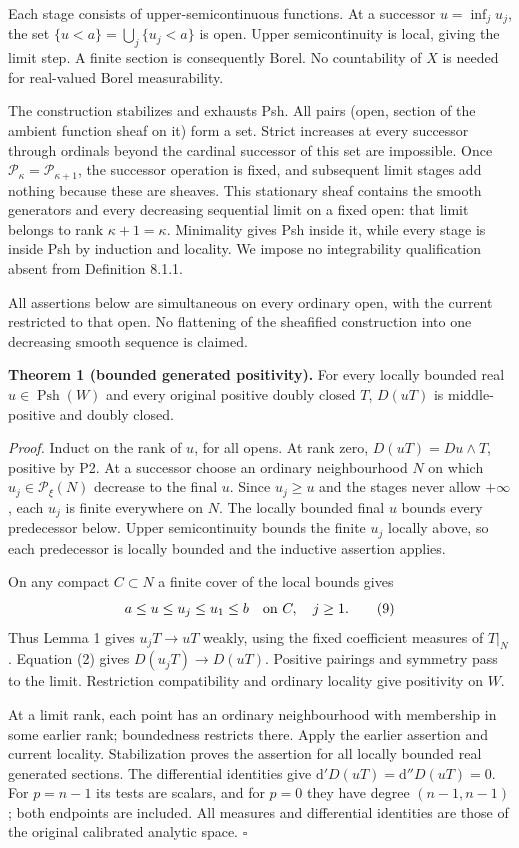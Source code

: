 \documentclass[
  11pt,
]{article}
\begin{document}
Each stage consists of upper-semicontinuous functions. At a successor
\(u=\inf_j u_j\), the set \(\{u<a\}=\bigcup_j\{u_j<a\}\) is open. Upper
semicontinuity is local, giving the limit step. A finite section is
consequently Borel. No countability of \(X\) is needed for real-valued
Borel measurability.

The construction stabilizes and exhausts Psh. All pairs (open, section
of the ambient function sheaf on it) form a set. Strict increases at
every successor through ordinals beyond the cardinal successor of this
set are impossible. Once \(\mathcal P_\kappa=\mathcal P_{\kappa+1}\),
the successor operation is fixed, and subsequent limit stages add
nothing because these are sheaves. This stationary sheaf contains the
smooth generators and every decreasing sequential limit on a fixed open:
that limit belongs to rank \(\kappa+1=\kappa\). Minimality gives Psh
inside it, while every stage is inside Psh by induction and locality. We
impose no integrability qualification absent from Definition 8.1.1.

All assertions below are simultaneous on every ordinary open, with the
current restricted to that open. No flattening of the sheafified
construction into one decreasing smooth sequence is claimed.

\textbf{Theorem 1 (bounded generated positivity).} For every locally
bounded real \(u\in\operatorname{Psh}(W)\) and every original positive
doubly closed \(T\), \(D(uT)\) is middle-positive and doubly closed.

\emph{Proof.} Induct on the rank of \(u\), for all opens. At rank zero,
\(D(uT)=Du\wedge T\), positive by P2. At a successor choose an ordinary
neighbourhood \(N\) on which \(u_j\in\mathcal P_\xi(N)\) decrease to the
final \(u\). Since \(u_j\geq u\) and the stages never allow \(+\infty\),
each \(u_j\) is finite everywhere on \(N\). The locally bounded final
\(u\) bounds every predecessor below. Upper semicontinuity bounds the
finite \(u_j\) locally above, so each predecessor is locally bounded and
the inductive assertion applies.

On any compact \(C\subset N\) a finite cover of the local bounds gives
\[a\leq u\leq u_j\leq u_1\leq b\quad\hbox{on }C,\quad j\geq1. \tag{9}\]
Thus Lemma 1 gives \(u_jT\to uT\) weakly, using the fixed coefficient
measures of \(T|_N\). Equation (2) gives \(D(u_jT)\to D(uT)\). Positive
pairings and symmetry pass to the limit. Restriction compatibility and
ordinary locality give positivity on \(W\).

At a limit rank, each point has an ordinary neighbourhood with
membership in some earlier rank; boundedness restricts there. Apply the
earlier assertion and current locality. Stabilization proves the
assertion for all locally bounded real generated sections. The
differential identities give \(\mathrm d'D(uT)=\mathrm d''D(uT)=0\). For
\(p=n-1\) its tests are scalars, and for \(p=0\) they have degree
\((n-1,n-1)\); both endpoints are included. All measures and
differential identities are those of the original calibrated analytic
space. \(\square\)
\end{document}
